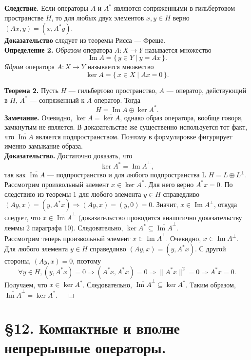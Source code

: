 \documentclass[12pt,a4paper, titlepage]{article}
\renewcommand{\Im}{\mathop{\mathrm{Im}}\nolimits}
\begin{document}
\textbf{Следствие.} Если операторы $A$ и $A^*$ являются сопряженными в гильбертовом пространстве $H$, то для любых двух элементов $x, y \in H$ верно $(Ax, y) = (x, A^*y).$\\
\textbf{Доказательство} следует из теоремы Рисса --- Фреше.\\

\textbf{Определение 2.} \textit{Образом} оператора $A: X \to Y$ называется множество
$$
\Im A = \{\,y \in Y \mid y = Ax\,\}.
$$
\textit{Ядром} оператора $A: X \to Y$ называется множество
$$
\ker A = \{\,x \in X \mid Ax = 0\,\}.
$$

\textbf{Теорема 2.} Пусть $H$ --- гильбертово пространство, $A$ --- оператор, действующий в $H$, $A^*$ --- сопряженный к $A$ оператор. Тогда
$$
H = \overline{\Im A} \oplus \ker A^*.
$$
\textbf{Замечание.} Очевидно, $\ker A = \overline{\ker A}$, однако образ оператора, вообще говоря, замкнутым не является. В доказательстве же существенно используется тот факт, что $\overline{\Im A}$ является подпространством. Поэтому в формулировке фигурирует именно замыкание образа.\\
\textbf{Доказательство.} Достаточно доказать, что
$$
\ker A^* = \overline{\Im A}^\perp,
$$
так как $\overline{\Im A}$ --- подпространство и для любого подпространства L $H = L \oplus L^\perp$.\\

Рассмотрим произвольный элемент $x \in \ker A^*$. Для него верно $A^*x = 0$. По следствию из теоремы 1 для любого элемента $y \in H$ справедливо $(Ay, x) = (y, A^*x) \Rightarrow (Ay, x) = (y, 0) = 0$. Значит, $x \in {\Im A}^\perp$, откуда следует, что $x\in \overline{\Im A}^\perp$ (доказательство проводится аналогично доказательству леммы 2 параграфа 10). Следовательно, $\ker A^* \subseteq \overline{\Im A}^\perp$.\\

Рассмотрим теперь произвольный элемент $x \in \overline{\Im A}^\perp$. Очевидно, $x \in {\Im A}^\perp$. Для любого элемента $y \in H$ справедливо $(Ay, x) = (y, A^*x)$. С другой стороны, $(Ay, x) = 0$, поэтому
$$
\forall y \in H, (y, A^*x) = 0 \Rightarrow (A^*x, A^*x) = 0 \Rightarrow \|A^*x\|^2 = 0 
\Rightarrow A^*x = 0.
$$
Получаем, что $x \in \ker A^*$. Следовательно, $\overline{\Im A}^\perp \subseteq \ker A^*$. Таким образом, $\overline{\Im A}^\perp = \ker A^*$. $\quad \Box$\\



\section*{ \S 12. Компактные и вполне непрерывные операторы.}
\end{document}
